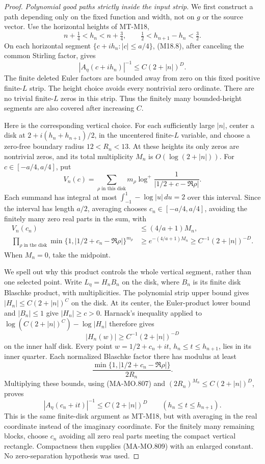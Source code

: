 \begin{proof}
\emph{Polynomial good paths strictly inside the input strip.}
We first construct a path depending only on the fixed
function and width, not on \(g\) or the source vector.
Use the horizontal heights of MT-M18,
\[
 n+\tfrac14<h_n<n+\tfrac34,\qquad
             \tfrac12<h_{n+1}-h_n<\tfrac32 .
 \tag{MA-MO.804}
\]
On each horizontal segment
\(\{c+ih_n:|c|\le a/4\}\), (M18.8), after canceling
the common Stirling factor, gives
\[
             |A_\eta(c+ih_n)|^{-1}
                     \le C(2+|n|)^D .
 \tag{MA-MO.805}
\]
The finite deleted Euler factors are bounded away from
zero on this fixed positive finite-\(L\) strip.
The height choice avoids every nontrivial zero ordinate.
There are no trivial finite-\(L\) zeros in this strip.
Thus the finitely many bounded-height segments are also
covered after increasing \(C\).

Here is the corresponding vertical choice. For each
sufficiently large \(|n|\), center a disk at
\(2+i(h_n+h_{n+1})/2\), in the uncentered finite-\(L\)
variable, and choose a zero-free boundary radius
\(12<R_n<13\). At these heights its only zeros are
nontrivial zeros, and its total multiplicity \(M_n\)
is \(O(\log(2+|n|))\). For \(c\in[-a/4,a/4]\), put
\[
 V_n(c)=
 \sum_{\rho\text{ in this disk}}
       m_\rho\log^+\frac1{|1/2+c-\Re\rho|}.
 \tag{MA-MO.806}
\]
Each summand has integral at most
\(\int_{-1}^{1}-\log|u|\,du=2\) over this interval.
Since the interval has length \(a/2\), averaging
chooses \(c_n\in[-a/4,a/4]\), avoiding the finitely
many zero real parts in the sum, with
\[
 \begin{aligned}
 V_n(c_n)&\le (4/a+1)M_n,\\
 \prod_{\rho\text{ in the disk}}
       \min\{1,|1/2+c_n-\Re\rho|\}^{m_\rho}
           &\ge e^{-(4/a+1)M_n}
            \ge C^{-1}(2+|n|)^{-D}.
 \end{aligned}
 \tag{MA-MO.807}
\]
When \(M_n=0\), take the midpoint.

We spell out why this product controls the whole
vertical segment, rather than one selected point.
Write \(L_\eta=H_nB_n\) on the disk, where \(B_n\)
is its finite disk Blaschke product, with multiplicities.
The polynomial strip upper bound gives
\(|H_n|\le C(2+|n|)^C\) on the disk. At its center,
the Euler-product lower bound and \(|B_n|\le1\)
give \(|H_n|\ge c>0\).
Harnack's inequality applied to
\(\log(C(2+|n|)^C)-\log|H_n|\) therefore gives
\[
                     |H_n(w)|\ge C^{-1}(2+|n|)^{-D}
 \tag{MA-MO.808}
\]
on the inner half disk.
Every point \(w=1/2+c_n+it\),
\(h_n\le t\le h_{n+1}\), lies in its inner quarter.
Each normalized Blaschke factor there has modulus
at least
\[
       \frac{\min\{1,|1/2+c_n-\Re\rho|\}}{2R_n}.
\]
Multiplying these bounds, using (MA-MO.807) and
\((2R_n)^{M_n}\le C(2+|n|)^D\), proves
\[
 |A_\eta(c_n+it)|^{-1}\le C(2+|n|)^D
                      \qquad(h_n\le t\le h_{n+1}).
 \tag{MA-MO.809}
\]
This is the same finite-disk argument as MT-M18,
but with averaging in the real coordinate instead
of the imaginary coordinate. For the finitely many
remaining blocks, choose \(c_n\) avoiding all zero
real parts meeting the compact vertical rectangle.
Compactness then supplies (MA-MO.809) with an enlarged
constant. No zero-separation hypothesis was used.


\end{proof}
